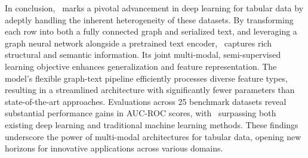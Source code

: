 In conclusion, \tabglm\ marks a pivotal advancement in deep learning for tabular data by adeptly handling the inherent heterogeneity of these datasets. 
By transforming each row into both a fully connected graph and serialized text, and leveraging a graph neural network alongside a pretrained text encoder, \tabglm\ captures rich structural and semantic information. 
Its joint multi-modal, semi-supervised learning objective enhances generalization and feature representation. 
The model's flexible graph-text pipeline efficiently processes diverse feature types, resulting in a streamlined architecture with significantly fewer parameters than state-of-the-art approaches. 
Evaluations across 25 benchmark datasets reveal substantial performance gains in AUC-ROC scores, with \tabglm\ surpassing both existing deep learning and traditional machine learning methods. 
These findings underscore the power of multi-modal architectures for tabular data, opening new horizons for innovative applications across various domains.
